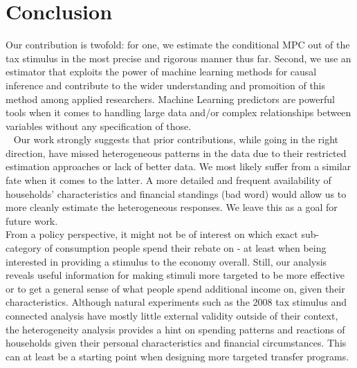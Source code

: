 \section{Conclusion} \label{sec:conc}
Our contribution is twofold: for one, we estimate the conditional MPC out of the tax stimulus in the most precise and rigorous manner thus far. Second, we use an estimator that exploits the power of machine learning methods for causal inference and contribute to the wider understanding and promoition of this method among applied researchers. Machine Learning predictors are powerful tools when it comes to handling large data and/or complex relationships between variables without any specification of those. \\ 
Our work strongly suggests that prior contributions, while going in the right direction, have missed heterogeneous patterns in the data due to their restricted estimation approaches or lack of better data. We most likely suffer from a similar fate when it comes to the latter. A more detailed and frequent availability of households' characteristics and financial standings (bad word) would allow us to more cleanly estimate the heterogeneous responses. We leave this as a goal for future work. \\
From a policy perspective, it might not be of interest on which exact sub-category of consumption people spend their rebate on - at least when being interested in providing a stimulus to the economy overall. Still, our analysis reveals useful information for making stimuli more targeted to be more effective or to get a general sense of what people spend additional income on, given their characteristics. Although natural experiments such as the 2008 tax stimulus and connected analysis have mostly little external validity outside of their context, the heterogeneity analysis provides a hint on spending patterns and reactions of households given their personal characteristics and financial circumstances. This can at least be a starting point when designing more targeted transfer programs. 